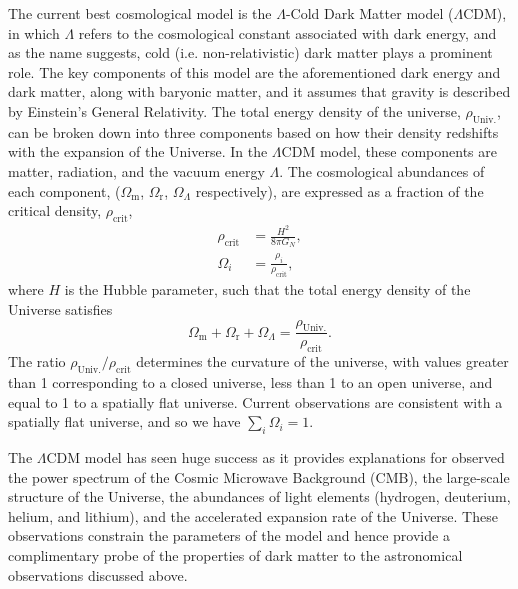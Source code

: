 The current best cosmological model is the $\Lambda$-Cold Dark Matter model ($\Lambda$CDM), in which $\Lambda$ refers to the cosmological constant associated with dark energy, and as the name suggests, cold (i.e. non-relativistic) dark matter plays a prominent role. The key components of this model are the aforementioned dark energy and dark matter, along with baryonic matter, and it assumes that gravity is described by Einstein's General Relativity. The total energy density of the universe, $\rho_\mathrm{Univ.}$, can be broken down into three components based on how their density redshifts with the expansion of the Universe. In the $\Lambda$CDM model, these components are matter, radiation, and the vacuum energy $\Lambda$. The cosmological abundances of each component, ($\Omega_\mathrm{m}$, $\Omega_\mathrm{r}$, $\Omega_\Lambda$ respectively), are expressed as a fraction of the critical density, $\rho_\mathrm{crit}$,     
\begin{align}
    \rho_\mathrm{crit}   & = \frac{H^2}{8 \pi G_N},\\
    \Omega_i & = \frac{\rho_i}{\rho_\mathrm{crit}},
\end{align}
where $H$ is the Hubble parameter, such that the total energy density of the Universe satisfies
\begin{equation}
    \Omega_\mathrm{m} + \Omega_\mathrm{r} + \Omega_\Lambda = \frac{\rho_\mathrm{Univ.}}{\rho_\mathrm{crit}}.
\end{equation}
The ratio $\rho_\mathrm{Univ.}/\rho_\mathrm{crit}$ determines the curvature of the universe, with values greater than 1 corresponding to a closed universe, less than 1 to an open universe, and equal to 1 to a spatially flat universe. Current observations are consistent with a spatially flat universe, and so we have $\sum_i \Omega_i = 1$.


The $\Lambda$CDM model has seen huge success as it provides explanations for observed the power spectrum of the Cosmic Microwave Background (CMB), the large-scale structure of the Universe, the abundances of light elements (hydrogen, deuterium, helium, and lithium), and the accelerated expansion rate of the Universe. These observations constrain the parameters of the model and hence provide a complimentary probe of the properties of dark matter to the astronomical observations discussed above.

